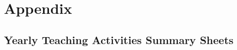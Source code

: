 \chapter{Appendix}
\label{app}

\vspace{-10mm}


\section{Yearly Teaching Activities Summary Sheets}
\label{app:otherTeaching}


%

%
